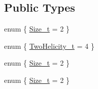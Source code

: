 \subsection*{Public Types}
\begin{DoxyCompactItemize}
\item 
enum \{ \mbox{\hyperlink{structHadron_1_1H2D3E2Rep_aef109485a160792c8db0b5e654023b5da93e6fb724961587a9183ab88aa67dd3d}{Size\+\_\+t}} = 2
 \}
\item 
enum \{ \mbox{\hyperlink{structHadron_1_1H2D3E2Rep_a3e4a282fc726900f5ac7a41aeaebaae1a5467cfe4c1d2ce69240c66541b5e7d45}{Two\+Helicity\+\_\+t}} = 4
 \}
\item 
enum \{ \mbox{\hyperlink{structHadron_1_1H2D3E2Rep_aef109485a160792c8db0b5e654023b5da93e6fb724961587a9183ab88aa67dd3d}{Size\+\_\+t}} = 2
 \}
\item 
enum \{ \mbox{\hyperlink{structHadron_1_1H2D3E2Rep_aef109485a160792c8db0b5e654023b5da93e6fb724961587a9183ab88aa67dd3d}{Size\+\_\+t}} = 2
 \}
\end{DoxyCompactItemize}
